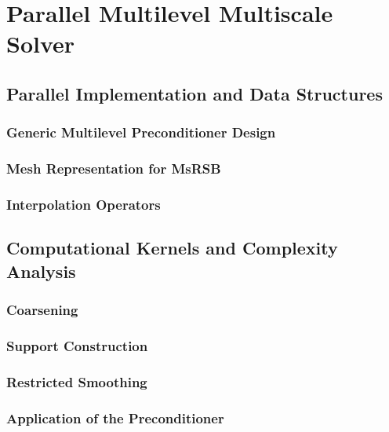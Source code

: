 \chapter{Parallel Multilevel Multiscale Solver}

\section{Parallel Implementation and Data Structures}

\subsection{Generic Multilevel Preconditioner Design}

\subsection{Mesh Representation for MsRSB}

\subsection{Interpolation Operators}

\section{Computational Kernels and Complexity Analysis}

\subsection{Coarsening}

\subsection{Support Construction}

\subsection{Restricted Smoothing}

\subsection{Application of the Preconditioner}

